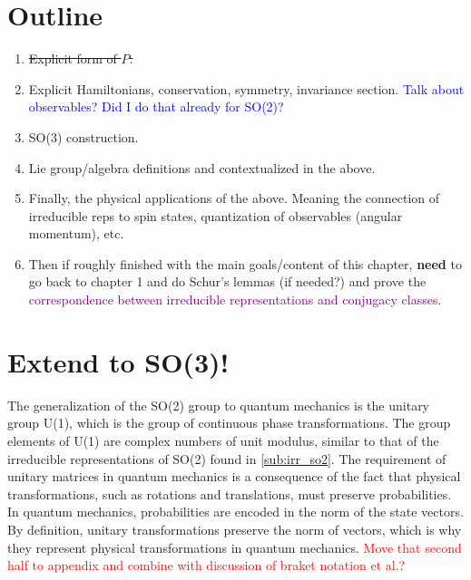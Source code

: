     \section{Outline}
    \begin{enumerate}
        \item \sout{Explicit form of $P$.}
        \item Explicit Hamiltonians, conservation, symmetry, invariance section. \textcolor{blue}{Talk about observables? Did I do that already for SO(2)?}
        \item SO(3) construction.
        \item Lie group/algebra definitions and contextualized in the above.
        \item Finally, the physical applications of the above. Meaning the connection of irreducible reps to spin states, quantization of observables (angular momentum), etc.
        \item Then if roughly finished with the main goals/content of this chapter, \textbf{need} to go back to chapter 1 and do Schur's lemmas (if needed?) and prove the \textcolor{purple}{correspondence between irreducible representations and conjugacy classes}.
    \end{enumerate}

    \section{Extend to SO(3)!}\label{sub:phys_J}
    The generalization of the SO(2) group to quantum mechanics is the unitary group U(1), which is the group of continuous phase transformations. The group elements of U(1) are complex numbers of unit modulus, similar to that of the irreducible representations of SO(2) found in \cref{sub:irr_so2}. The requirement of unitary matrices in quantum mechanics is a consequence of the fact that physical transformations, such as rotations and translations, must preserve probabilities. In quantum mechanics, probabilities are encoded in the norm of the state vectors. By definition, unitary transformations preserve the norm of vectors, which is why they represent physical transformations in quantum mechanics. \textcolor{red}{Move that second half to appendix and combine with discussion of braket notation et al.?}

